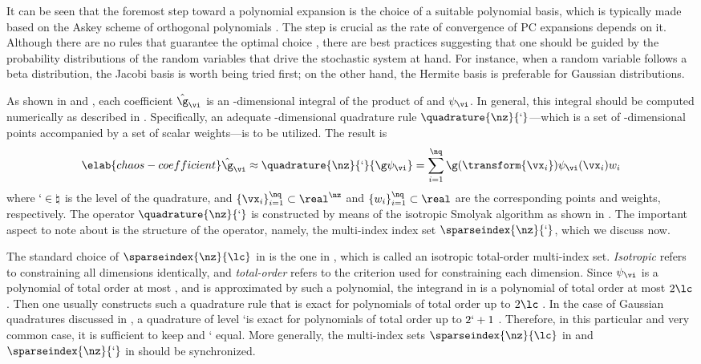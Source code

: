 It can be seen that the foremost step toward a polynomial expansion is the
choice of a suitable polynomial basis, which is typically made based on the
Askey scheme of orthogonal polynomials \cite{xiu2010}. The step is crucial as
the rate of convergence of \ac{PC} expansions depends on it. Although there are
no rules that guarantee the optimal choice \cite{knio2006}, there are best
practices suggesting that one should be guided by the probability distributions
of the random variables that drive the stochastic system at hand. For instance,
when a random variable follows a beta distribution, the Jacobi basis is worth
being tried first; on the other hand, the Hermite basis is preferable for
Gaussian distributions.

As shown in  and , each
coefficient $\hat{\g}_{\vi}$ is an \nz-dimensional integral of the product of \g
and $\psi_{\vi}$. In general, this integral should be computed numerically as
described in . Specifically, an adequate
\nz-dimensional quadrature rule $\quadrature{\nz}{\lq}$---which is a set of
\nz-dimensional points accompanied by a set of scalar weights---is to be
utilized. The result is
\begin{equation} \elab{chaos-coefficient}
  \hat{\g}_{\vi} \approx \quadrature{\nz}{\lq}{\g \psi_{\vi}} = \sum_{i = 1}^\nq \g(\transform{\vx_i}) \psi_{\vi}(\vx_i) w_i
\end{equation}
where $\lq \in \natural$ is the level of the quadrature, and $\{ \vx_i \}_{i =
1}^\nq \subset \real^\nz$ and $\{ w_i \}_{i = 1}^\nq \subset \real$ are the
corresponding points and weights, respectively. The operator
$\quadrature{\nz}{\lq}$ is constructed by means of the isotropic Smolyak
algorithm \cite{smolyak1963} as shown in . The
important aspect to note about  is the structure of
the operator, namely, the multi-index index set $\sparseindex{\nz}{\lq}$, which
we discuss now.

The standard choice of $\sparseindex{\nz}{\lc}$ in  is the
one in , which is called an isotropic
total-order multi-index set. \emph{Isotropic} refers to constraining all
dimensions identically, and \emph{total-order} refers to the criterion used for
constraining each dimension. Since $\psi_{\vi}$ is a polynomial of total order
at most \lc, and \g is approximated by such a polynomial, the integrand in
 is a polynomial of total order at most $2 \lc$. Then
one usually constructs such a quadrature rule that is exact for polynomials of
total order up to $2 \lc$ \cite{eldred2008}. In the case of Gaussian quadratures
discussed in , a quadrature of level \lq is exact
for polynomials of total order up to $2 \lq + 1$ \cite{heiss2008}. Therefore, in
this particular and very common case, it is sufficient to keep \lc and \lq
equal. More generally, the multi-index sets $\sparseindex{\nz}{\lc}$ in
 and $\sparseindex{\nz}{\lq}$ in 
should be synchronized.

